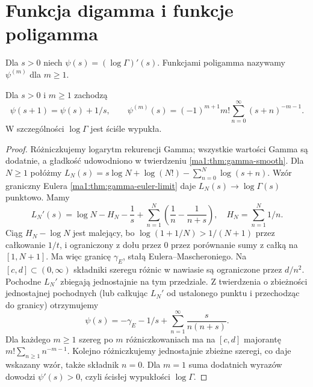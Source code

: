 \section{Funkcja digamma i funkcje poligamma}
\begin{definicja}
\label{ma1:def:polygamma}
Dla $s>0$ niech $\psi(s)=(\log\Gamma)'(s)$.
Funkcjami poligamma nazywamy $\psi^{(m)}$ dla $m\ge1$.
\end{definicja}
\begin{twierdzenie}
\label{ma1:thm:polygamma-series}
Dla $s>0$ i $m\ge1$ zachodzą
\[
 \psi(s+1)=\psi(s)+1/s,\qquad
 \psi^{(m)}(s)=(-1)^{m+1}m!\sum_{n=0}^\infty(s+n)^{-m-1}.
\]
W szczególności $\log\Gamma$ jest ściśle wypukła.
\end{twierdzenie}
\begin{proof}
Różniczkujemy logarytm rekurencji Gamma; wszystkie
wartości Gamma są dodatnie, a gładkość udowodniono
w twierdzeniu \ref{ma1:thm:gamma-smooth}.
Dla $N\ge1$ połóżmy
$L_N(s)=s\log N+\log(N!)-\sum_{n=0}^N\log(s+n)$.
Wzór graniczny Eulera \ref{ma1:thm:gamma-euler-limit}
daje $L_N(s)\to\log\Gamma(s)$ punktowo.
Mamy
\[
 L_N'(s)=\log N-H_N-\frac1s+
             \sum_{n=1}^N\left(\frac1n-\frac1{n+s}\right),
 \quad H_N=\sum_{n=1}^N1/n.
\]
Ciąg $H_N-\log N$ jest malejący, bo
$\log(1+1/N)>1/(N+1)$ przez całkowanie $1/t$,
i ograniczony z dołu przez $0$ przez porównanie
sumy z całką na $[1,N+1]$. Ma więc granicę
$\gamma_{\!E}$, stałą Eulera--Mascheroniego.
Na $[c,d]\subset(0,\infty)$ składniki szeregu
różnic w nawiasie są ograniczone przez $d/n^2$.
Pochodne $L_N'$ zbiegają jednostajnie na tym
przedziale. Z twierdzenia o zbieżności jednostajnej
pochodnych (lub całkując $L_N'$ od ustalonego punktu
i przechodząc do granicy) otrzymujemy
\[
 \psi(s)=-\gamma_{\!E}-1/s+
 \sum_{n=1}^\infty\frac{s}{n(n+s)}.
\]
Dla każdego $m\ge1$ szereg po $m$ różniczkowaniach
ma na $[c,d]$ majorantę $m!\sum_{n\ge1}n^{-m-1}$.
Kolejno różniczkujemy jednostajnie zbieżne szeregi,
co daje wskazany wzór, także składnik $n=0$.
Dla $m=1$ suma dodatnich wyrazów dowodzi
$\psi'(s)>0$, czyli ścisłej wypukłości $\log\Gamma$.
\end{proof}

